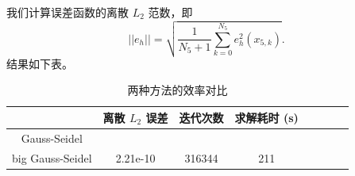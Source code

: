\documentclass[lang=cn,11pt,a4paper]{elegantpaper}
\begin{document}
我们计算误差函数的离散 $L_2$ 范数，即
\begin{equation}
    ||e_h|| = \sqrt {\frac{1}{N_5+1} \sum_{k=0}^{N_5} e_h^2(x_{5,k})}.
\end{equation}
结果如下表。

\begin{table}[H]
    \centering
    \begin{tabular}{|c|c|c|c|c|c|c|c|}
    \hline
                        & 离散 $L_2$ 误差 & 迭代次数 & 求解耗时 (s)\\ \hline
    Gauss-Seidel            &  &  & \\
\hline
    big Gauss-Seidel           & 2.21e-10 & 316344 & 211\\ \hline
    \end{tabular}
    \caption{\small 两种方法的效率对比}
\end{table}

\appendix
\addappheadtotoc
\end{document}

